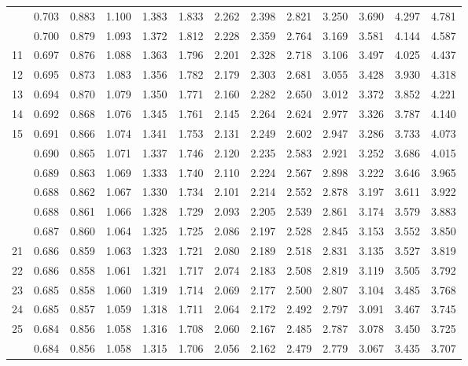 \begin{center}
{\begin{tabular}{r | rrr rr rrrr rrr}
\gray9	&	0.703	&	0.883	&	1.100	&	1.383	&	1.833	&	2.262	&	2.398	&	2.821	&	3.250	&	3.690	&	4.297	&	4.781	\\
\gray 10	&	0.700	&	0.879	&	1.093	&	1.372	&	1.812	&	2.228	&	2.359	&	2.764	&	3.169	&	3.581	&	4.144	&	4.587	\\
11	&	0.697	&	0.876	&	1.088	&	1.363	&	1.796	&	2.201	&	2.328	&	2.718	&	3.106	&	3.497	&	4.025	&	4.437	\\
 12	&	0.695	&	0.873	&	1.083	&	1.356	&	1.782	&	2.179	&	2.303	&	2.681	&	3.055	&	3.428	&	3.930	&	4.318	\\
13	&	0.694	&	0.870	&	1.079	&	1.350	&	1.771	&	2.160	&	2.282	&	2.650	&	3.012	&	3.372	&	3.852	&	4.221	\\
 14	&	0.692	&	0.868	&	1.076	&	1.345	&	1.761	&	2.145	&	2.264	&	2.624	&	2.977	&	3.326	&	3.787	&	4.140	\\
15	&	0.691	&	0.866	&	1.074	&	1.341	&	1.753	&	2.131	&	2.249	&	2.602	&	2.947	&	3.286	&	3.733	&	4.073	\\
\gray 16	&	0.690	&	0.865	&	1.071	&	1.337	&	1.746	&	2.120	&	2.235	&	2.583	&	2.921	&	3.252	&	3.686	&	4.015	\\
\gray 17	&	0.689	&	0.863	&	1.069	&	1.333	&	1.740	&	2.110	&	2.224	&	2.567	&	2.898	&	3.222	&	3.646	&	3.965	\\
\gray 18	&	0.688	&	0.862	&	1.067	&	1.330	&	1.734	&	2.101	&	2.214	&	2.552	&	2.878	&	3.197	&	3.611	&	3.922	\\
\gray 19	&	0.688	&	0.861	&	1.066	&	1.328	&	1.729	&	2.093	&	2.205	&	2.539	&	2.861	&	3.174	&	3.579	&	3.883	\\
\gray 20	&	0.687	&	0.860	&	1.064	&	1.325	&	1.725	&	2.086	&	2.197	&	2.528	&	2.845	&	3.153	&	3.552	&	3.850	\\
21	&	0.686	&	0.859	&	1.063	&	1.323	&	1.721	&	2.080	&	2.189	&	2.518	&	2.831	&	3.135	&	3.527	&	3.819	\\
22	&	0.686	&	0.858	&	1.061	&	1.321	&	1.717	&	2.074	&	2.183	&	2.508	&	2.819	&	3.119	&	3.505	&	3.792	\\
23	&	0.685	&	0.858	&	1.060	&	1.319	&	1.714	&	2.069	&	2.177	&	2.500	&	2.807	&	3.104	&	3.485	&	3.768	\\
24	&	0.685	&	0.857	&	1.059	&	1.318	&	1.711	&	2.064	&	2.172	&	2.492	&	2.797	&	3.091	&	3.467	&	3.745	\\
25	&	0.684	&	0.856	&	1.058	&	1.316	&	1.708	&	2.060	&	2.167	&	2.485	&	2.787	&	3.078	&	3.450	&	3.725	\\
\gray 26	&	0.684	&	0.856	&	1.058	&	1.315	&	1.706	&	2.056	&	2.162	&	2.479	&	2.779	&	3.067	&	3.435	&	3.707	\\

\end{tabular}}
\end{center}
